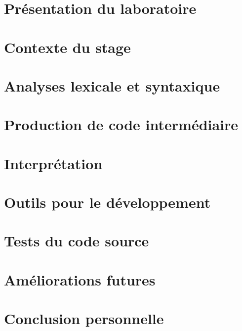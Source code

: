 \documentclass[a4paper,12pt]{article}
\begin{document}
\section{Présentation du laboratoire}

\newpage{}

\section{Contexte du stage}

\newpage{}

\section{Analyses lexicale et syntaxique}

\newpage{}

\section{Production de code intermédiaire}

\newpage{}

\section{Interprétation}

\newpage{}

\section{Outils pour le développement}

\newpage{}

\section{Tests du code source}

\newpage{}

\section{Améliorations futures}

\newpage{}

\section*{Conclusion personnelle}

\newpage{}
\end{document}
